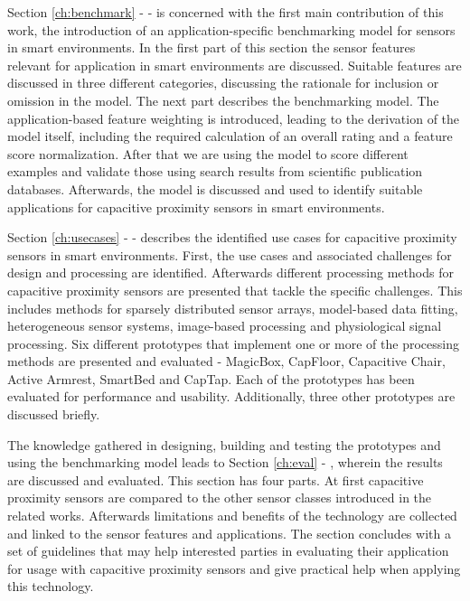 Section \ref{ch:benchmark} - \emph{} - is concerned with the first main contribution of this work, the introduction of an application-specific benchmarking model for sensors in smart environments. In the first part of this section the sensor features relevant for application in smart environments are discussed. Suitable features are discussed in three different categories, discussing the rationale for inclusion or omission in the model. The next part describes the benchmarking model. The application-based feature weighting is introduced, leading to the derivation of the model itself, including the required calculation of an overall rating and a feature score normalization. After that we are using the model to score different examples and validate those using search results from scientific publication databases. Afterwards, the model is discussed and used to identify suitable applications for capacitive proximity sensors in smart environments.

Section \ref{ch:usecases} - \emph{} - describes the identified use cases for capacitive proximity sensors in smart environments. First, the use cases and associated challenges for design and processing are identified. Afterwards different processing methods for capacitive proximity sensors are presented that tackle the specific challenges. This includes methods for sparsely distributed sensor arrays, model-based data fitting, heterogeneous sensor systems, image-based processing and physiological signal processing. Six different prototypes that implement one or more of the processing methods are presented and evaluated - MagicBox, CapFloor, Capacitive Chair,  Active Armrest, SmartBed and CapTap. Each of the prototypes has been evaluated for performance and usability. Additionally, three other prototypes are discussed briefly.

The knowledge gathered in designing, building and testing the prototypes and using the benchmarking model leads to Section \ref{ch:eval} - \emph{}, wherein the results are discussed and evaluated. This section has four parts. At first capacitive proximity sensors are compared to the other sensor classes introduced in the related works. Afterwards limitations and benefits of the technology are collected and linked to the sensor features and applications. The section concludes with a set of guidelines that may help interested parties in evaluating their application for usage with capacitive proximity sensors and give practical help when applying this technology.

